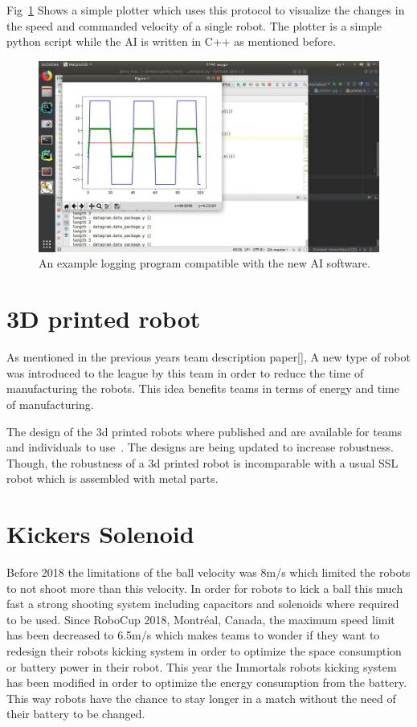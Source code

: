 \documentclass[runningheads]{llncs}
\begin{document}
Fig~\ref{fig1_plotter} Shows a simple plotter which uses this protocol to visualize the changes in the speed and commanded velocity of a single robot. The plotter is a simple python script while the AI is written in C++ as mentioned before.

\begin{figure}
\includegraphics[width=\textwidth]{images/plotter.jpg}
\caption{An example logging program compatible with the new AI software.} \label{fig1_plotter}
\end{figure}

\section{3D printed robot}
As mentioned in the previous years team description paper[], A new type of robot was introduced to the league by this team in order to reduce the time of manufacturing the robots. This idea benefits teams in terms of energy and time of manufacturing.

The design of the 3d printed robots where published and are available for teams and individuals to use~\cite{ref_opensource}. The designs are being updated to increase robustness. Though, the robustness of a 3d printed robot is incomparable with a usual SSL robot which is assembled with metal parts.

\section{Kickers Solenoid}
Before 2018 the limitations of the ball velocity was 8m/s which limited the robots to not shoot more than this velocity. In order for robots to kick a ball this much fast a strong shooting system including capacitors and solenoids where required to be used. Since RoboCup 2018, Montréal, Canada, the maximum speed limit has been decreased to 6.5m/s which makes teams to wonder if they want to redesign their robots kicking system in order to optimize the space consumption or battery power in their robot. This year the Immortals robots kicking system has been modified in order to optimize the energy consumption from the battery. This way robots have the chance to stay longer in a match without the need of their battery to be changed.
\end{document}
